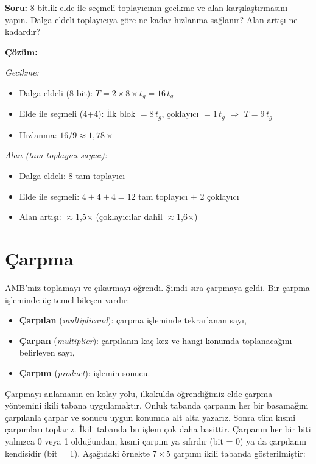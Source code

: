 \begin{ornek}[5.3]
\textbf{Soru:} 8 bitlik elde ile seçmeli toplayıcının gecikme ve alan karşılaştırmasını yapın. Dalga eldeli toplayıcıya göre ne kadar hızlanma sağlanır? Alan artışı ne kadardır?

\textbf{Çözüm:}

\emph{Gecikme:}
\begin{itemize}
  \item Dalga eldeli (8 bit): $T = 2 \times 8 \times t_g = 16\,t_g$
  \item Elde ile seçmeli (4+4): İlk blok $= 8\,t_g$, çoklayıcı $= 1\,t_g$ $\Rightarrow$ $T = 9\,t_g$
  \item Hızlanma: $16/9 \approx 1{,}78\times$
\end{itemize}

\emph{Alan (tam toplayıcı sayısı):}
\begin{itemize}
  \item Dalga eldeli: 8 tam toplayıcı
  \item Elde ile seçmeli: $4 + 4 + 4 = 12$ tam toplayıcı $+$ 2 çoklayıcı
  \item Alan artışı: $\approx$1{,}5$\times$ (çoklayıcılar dahil $\approx$1{,}6$\times$)
\end{itemize}
\end{ornek}

\section{Çarpma}
\label{sec:carpma}

AMB'miz toplamayı ve çıkarmayı öğrendi. Şimdi sıra çarpmaya geldi. Bir çarpma işleminde üç temel bileşen vardır:
%
\begin{itemize}
\item \textbf{Çarpılan} (\emph{multiplicand}): çarpma işleminde tekrarlanan sayı,
\item \textbf{Çarpan} (\emph{multiplier}): çarpılanın kaç kez ve hangi konumda toplanacağını belirleyen sayı,
\item \textbf{Çarpım} (\emph{product}): işlemin sonucu.
\end{itemize}

Çarpmayı anlamanın en kolay yolu, ilkokulda öğrendiğimiz elde çarpma yöntemini ikili tabana uygulamaktır. Onluk tabanda çarpanın her bir basamağını çarpılanla çarpar ve sonucu uygun konumda alt alta yazarız. Sonra tüm kısmi çarpımları toplarız. İkili tabanda bu işlem çok daha basittir. Çarpanın her bir biti yalnızca 0 veya 1 olduğundan, kısmi çarpım ya sıfırdır (bit = 0) ya da çarpılanın kendisidir (bit = 1). Aşağıdaki örnekte $7 \times 5$ çarpımı ikili tabanda gösterilmiştir:

